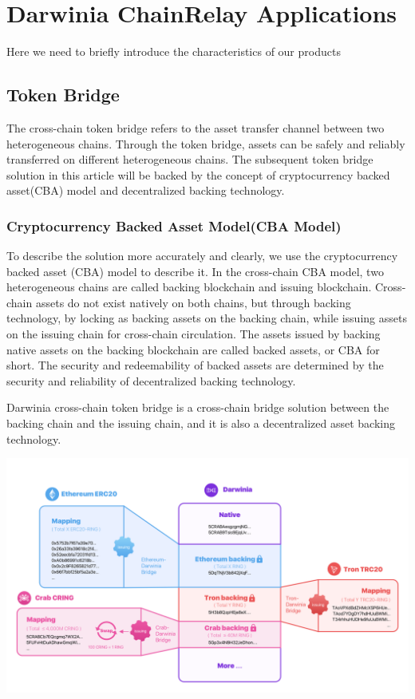 \section{Darwinia ChainRelay Applications}

Here we need to briefly introduce the characteristics of our products

\subsection*{Token Bridge}

The cross-chain token bridge refers to the asset transfer channel between two heterogeneous chains. Through the token bridge, assets can be safely and reliably transferred on different heterogeneous chains. The subsequent token bridge solution in this article will be backed by the concept of cryptocurrency backed asset(CBA) model and decentralized backing technology.

\subsubsection*{Cryptocurrency Backed Asset Model(CBA Model)}

To describe the solution more accurately and clearly, we use the cryptocurrency backed asset (CBA) model to describe it. In the cross-chain CBA model, two heterogeneous chains are called backing blockchain and issuing blockchain. Cross-chain assets do not exist natively on both chains, but through backing technology, by locking as backing assets on the backing chain, while issuing assets on the issuing chain for cross-chain circulation. The assets issued by backing native assets on the backing blockchain are called backed assets, or CBA for short. The security and redeemability of backed assets are determined by the security and reliability of decentralized backing technology.

Darwinia cross-chain token bridge is a cross-chain bridge solution between the backing chain and the issuing chain, and it is also a decentralized asset backing technology.

    \includegraphics[scale=0.14]{pic/tokenbank.png}



